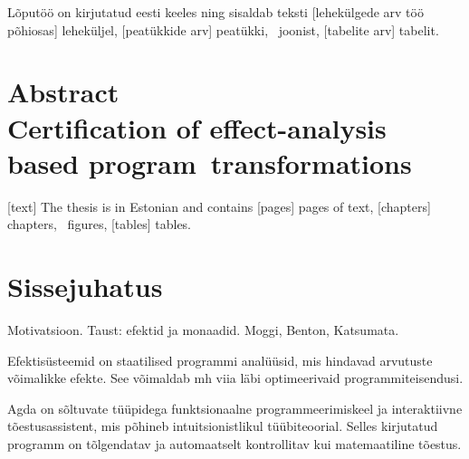 \documentclass[a4paper,12pt]{article}
\begin{document}
Lõputöö on kirjutatud eesti keeles ning sisaldab teksti [lehekülgede arv töö põhiosas] leheküljel, [peatükkide arv] peatükki, \totalfigures\ joonist, [tabelite arv] tabelit.
\clearpage\vspace*{0pt}

\section*{\centering Abstract\\
Certification of effect-analysis based program~transformations}

[text]
The thesis is in Estonian and contains [pages] pages of text, [chapters] chapters, \totalfigures\ figures, [tables] tables.
\clearpage\vspace*{0pt}

\tableofcontents

\clearpage\vspace*{0pt}

\listoffigures

\clearpage\vspace*{0pt}

\section{Sissejuhatus}

Motivatsioon. Taust: efektid ja monaadid. Moggi, Benton, Katsumata.

Efektisüsteemid on staatilised programmi analüüsid, mis hindavad arvutuste võimalikke efekte.
See võimaldab mh viia läbi optimeerivaid programmiteisendusi.




Agda on sõltuvate tüüpidega funktsionaalne programmeerimiskeel ja interaktiivne tõestusassistent,
mis põhineb intuitsionistlikul tüübiteoorial.
Selles kirjutatud programm on tõlgendatav ja automaatselt kontrollitav kui matemaatiline tõestus.
\end{document}
